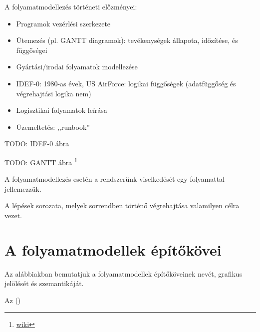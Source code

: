 \begin{megjegyzes}
A folyamatmodellezés történeti előzményei:

\begin{itemize}
	\item Programok vezérlési szerkezete
	\item Ütemezés (pl. GANTT diagramok): tevékenységek állapota, időzítése, és függőségei
	\item Gyártási/irodai folyamatok modellezése
	\item IDEF-0: 1980-as évek, US AirForce: logikai függőségek (adatfüggőség és végrehajtási logika nem)
	\item Logisztikai folyamatok leírása
	\item Üzemeltetés: ,,runbook''
\end{itemize}

TODO: IDEF-0 ábra


TODO: GANTT ábra \footnote{\url{wiki}}
\end{megjegyzes}

A folyamatmodellezés esetén a rendszerünk viselkedését egy folyamattal jellemezzük.

\begin{definicio}
	A  lépések sorozata, melyek sorrendben történő végrehajtása valamilyen célra vezet.
\end{definicio}	

\section{A folyamatmodellek építőkövei}

Az alábbiakban bemutatjuk a folyamatmodellek építőköveinek nevét, grafikus jelölését és szemantikáját.

\begin{definicio}
	 
\end{definicio}




\begin{megjegyzes}
	Az  ()
\end{megjegyzes}

